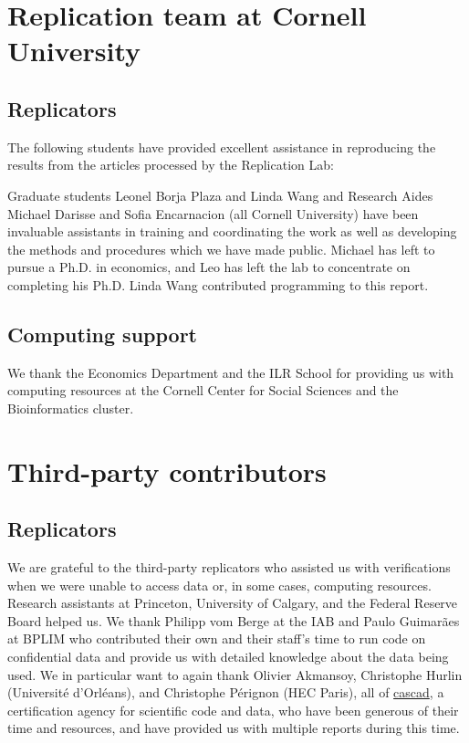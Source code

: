 
\section{Replication team at Cornell University}

\subsection{Replicators} 
\label{app:replicators}

The following \textbf{\teamsize} students have provided excellent assistance in reproducing the results from the \jiramcs{} articles processed by the Replication Lab:
%
%
%



Graduate students  Leonel Borja Plaza and Linda Wang and Research Aides Michael Darisse and Sofia Encarnacion (all Cornell University) have been invaluable assistants in training and coordinating the work as well as developing the methods and procedures which we have made public. Michael has left to pursue a Ph.D. in economics, and Leo has left the lab to concentrate on completing his Ph.D. Linda Wang contributed programming to this report. 

\subsection{Computing support}

We thank the Economics Department and the ILR School for providing us with computing resources at the Cornell Center for Social Sciences and the Bioinformatics cluster. 

\section{Third-party contributors}

\subsection{Replicators}
\label{app:3rdparty}

We are grateful to the  third-party replicators who assisted us with verifications when we were unable to access data or, in some cases, computing resources. 
%
Research assistants at Princeton, University of Calgary, and the Federal Reserve Board helped us. We thank Philipp vom Berge at the \ac{IAB} and  Paulo Guimarães at \ac{BPLIM} who contributed their own and their staff's time to  run code  on confidential data and provide us with detailed knowledge about the data being used. We in particular want to again thank Olivier Akmansoy, Christophe Hurlin (Université d'Orléans), and Christophe Pérignon (HEC Paris), all of \href{https://cascad.tech}{cascad}, a certification agency for scientific code and data, who have been generous of their time and resources, and have provided us with multiple reports during this time.  

